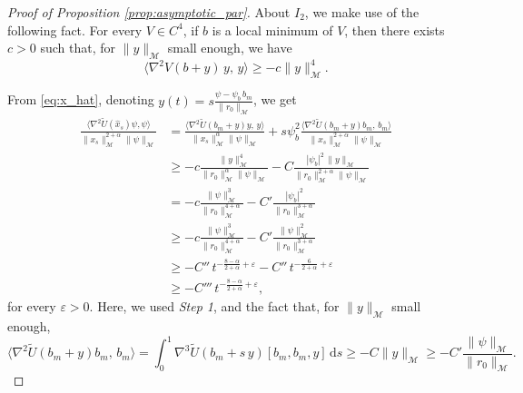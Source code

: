 \documentclass[a4paper,10pt]{amsart}
\newcommand{\ud}{\mathrm{d}}
\theoremstyle{plain}
\theoremstyle{definition}
\numberwithin{equation}{section}
\numberwithin{thm}{section}
\begin{document}
\begin{proof}[Proof of Proposition \ref{prop:asymptotic_par}]
About $I_2$, we make use of the following fact. For every $V \in C^4$, if $b$ is a local minimum of $V$, then there exists $c>0$ such that, for $\|y\|_\mathcal{M}$ small enough, we have
\[
\langle \nabla^2 V(b+y)\,y,\,y\rangle \ge -c \|y\|_\mathcal{M}^4.
\]

From \eqref{eq:x_hat}, denoting  $y(t)=s\frac{\psi-\psi_b\,b_m}{\|r_0\|_\mathcal{M}}$, we get
\[
\begin{aligned}
\frac{\langle\nabla^2 \tilde U(\hat x_s)\psi, \psi\rangle}{\|x_s\|_\mathcal{M}^{2+\alpha}\|\psi\|_\mathcal{M}} &= \frac{\langle \nabla^2 \tilde U(b_m+y)y,\,y\rangle}{\|x_s\|_\mathcal{M}^{\alpha}\|\psi\|_\mathcal{M}}+s\psi_b^2\frac{\langle \nabla^2 \tilde U(b_m+y) b_m, \, b_m\rangle}{\|x_s\|_\mathcal{M}^{2+\alpha}\|\psi\|_\mathcal{M}}
\\
&\ge -c \frac{\|y\|_\mathcal{M}^4}{\|r_0\|_\mathcal{M}^\alpha \|\psi\|_\mathcal{M}}-C\frac{|\psi_b|^2\,\|y\|_\mathcal{M}}{\|r_0\|_\mathcal{M}^{2+\alpha} \|\psi\|_\mathcal{M}}
\\
&= -c \frac{\|\psi\|_\mathcal{M}^3}{\|r_0\|_\mathcal{M}^{4+\alpha}}-C'\frac{|\psi_b|^2}{\|r_0\|_\mathcal{M}^{3+\alpha}}
\\
&\ge -c \frac{\|\psi\|_\mathcal{M}^3}{\|r_0\|_\mathcal{M}^{4+\alpha}}-C'\frac{\|\psi\|_\mathcal{M}^2}{\|r_0\|_\mathcal{M}^{3+\alpha}}
\\
&\ge -C''\,t^{-\frac{8-\alpha}{2+\alpha}+\varepsilon}-C''\,t^{-\frac{6}{2+\alpha}+\varepsilon}
\\
&\ge -C'''\,t^{{-\frac{8-\alpha}{2+\alpha}}+\varepsilon},
\end{aligned}
\]
for every $\varepsilon>0$. Here, we used {\em Step 1}, and the fact that, for $\|y\|_\mathcal{M}$ small enough,
\[
\langle \nabla^2 \tilde U(b_m+y)b_m,\,b_m\rangle = \int_0^1 \nabla^3 \tilde U(b_m+s\,y)[b_m,b_m,y]\,\ud s\ge -C\|y\|_\mathcal{M}\ge -C' \frac{\|\psi\|_\mathcal{M}}{\|r_0\|_\mathcal{M}}.
\]


\end{proof}
\end{document}
